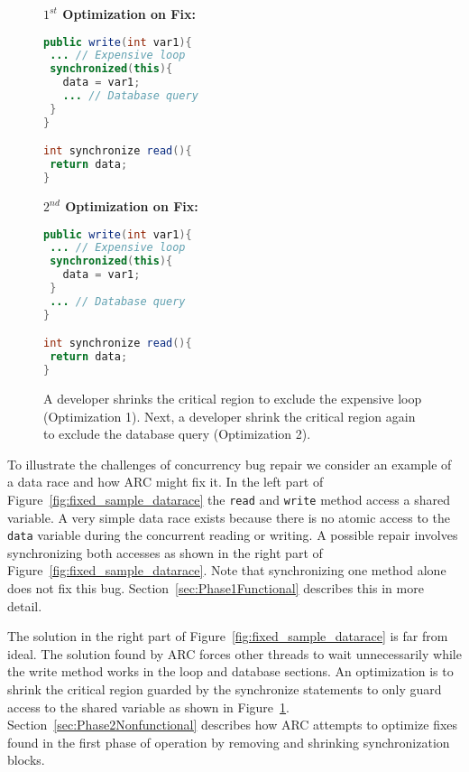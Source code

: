\documentclass[runningheads,a4paper]{llncs}
\begin{document}
\begin{figure}[t!]
\begin{minipage}{5cm}
\footnotesize{\textbf{$1^{st}$ Optimization on Fix:}}
\begin{lstlisting}[language=Java, morekeywords={synchronize}]
public write(int var1){
 ... // Expensive loop
 synchronized(this){
   data = var1;
   ... // Database query
 }
}

int synchronize read(){
 return data;
}
\end{lstlisting}
\end{minipage}\hfill
\begin{minipage}{5cm}
\footnotesize{\textbf{$2^{nd}$ Optimization on Fix:}}
\begin{lstlisting}[language=Java, morekeywords={synchronize}]
public write(int var1){
 ... // Expensive loop
 synchronized(this){
   data = var1;
 }
 ... // Database query
}

int synchronize read(){
 return data;
}
\end{lstlisting}
\end{minipage}
\caption{A developer shrinks the critical region to exclude the expensive loop (Optimization 1). Next, a developer shrink the critical region again to exclude the database query (Optimization 2).}
\label{fig:optimized_sample_datarace}
\end{figure}


To illustrate the challenges of concurrency bug repair we consider an example of a data race and how ARC might fix it. In the left part of Figure~\ref{fig:fixed_sample_datarace} the \texttt{read} and \texttt{write} method access a shared variable. A very simple data race exists because there is no atomic access to the \texttt{data} variable during the concurrent reading or writing. A possible repair involves synchronizing both accesses as shown in the right part of Figure~\ref{fig:fixed_sample_datarace}. Note that synchronizing one method alone does not fix this bug. Section~\ref{sec:Phase1Functional} describes this in more detail.

The solution in the right part of Figure~\ref{fig:fixed_sample_datarace} is far from ideal. The solution found by ARC forces other threads to wait unnecessarily while the write method works in the loop and database sections. An optimization is to shrink the critical region guarded by the synchronize statements to only guard access to the shared variable as shown in Figure~\ref{fig:optimized_sample_datarace}.  Section~\ref{sec:Phase2Nonfunctional} describes how ARC attempts to optimize fixes found in the first phase of operation by removing and shrinking synchronization blocks. 
\end{document}
